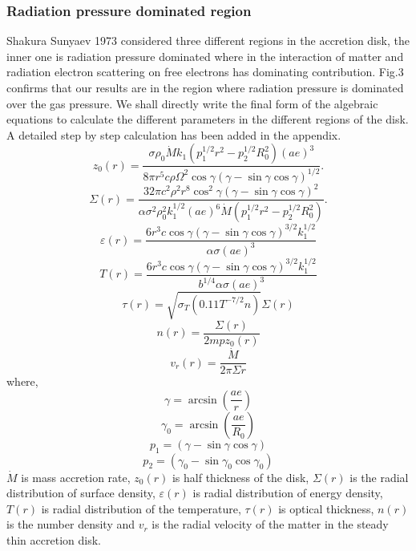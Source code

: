 \documentclass[useAMS,usenatbib]{mn2e}
\begin{document}
\subsubsection{Radiation pressure dominated region}
Shakura Sunyaev 1973 considered three different regions in the accretion disk, the inner one is radiation pressure dominated where in the interaction of matter and radiation electron scattering on free electrons has dominating contribution. Fig.3 confirms that our results are in the region where radiation pressure is dominated over the gas pressure. We shall directly write the final form of the algebraic equations to calculate the different parameters in the different regions of the disk. A detailed step by step calculation has been added in the appendix.
\begin{equation}
z_0(r) = \frac{\sigma\rho_0\dot{M}k_1\left(p_1^{1/2}r^2 - p_2^{1/2}R_0^2\right)(ae)^3}{8\pi r^5 c \rho \Omega^2\cos\gamma(\gamma - \sin\gamma\cos\gamma)^{1/2}}.
\end{equation}
\begin{equation}
\Sigma(r) = \frac{32\pi c^2\rho^2 r^8 \cos^2{\gamma}(\gamma - \sin\gamma\cos\gamma)^2}{\alpha\sigma^2\rho_0^2 k_1^{1/2}(ae)^6\dot{M}\left(p_1^{1/2}r^2 - p_2^{1/2}R_0^2\right)}.
\end{equation}
\begin{equation}
\varepsilon(r) = \frac{6 r^3 c \cos\gamma(\gamma - \sin\gamma\cos\gamma)^{3/2}k_1^{1/2}}{\alpha\sigma (ae)^3}
\end{equation}
\begin{equation}
T(r) = \frac{6r^3 c \cos\gamma (\gamma - \sin\gamma\cos\gamma)^{3/2}k_1^{1/2}}{b^{1/4}\alpha\sigma (ae)^3}
\end{equation}
\begin{equation}
\tau (r) = \sqrt{\sigma_T(0.11 T^{-7/2}n)}\Sigma(r)
\end{equation}
\begin{equation}
n(r) = \frac{\Sigma(r)}{2mpz_0(r)}
\end{equation}
\begin{equation}
v_r(r) = \frac{\dot{M}}{2\pi\Sigma r}
\end{equation}
where, 
\begin{equation} 
\gamma = \arcsin(\frac{ae}{r}) 
\end{equation}
\begin{equation}
\gamma_0 = \arcsin(\frac{ae}{R_0})
\end{equation}
\begin{equation}
p_1 = (\gamma - \sin\gamma\cos\gamma)
\end{equation}
\begin{equation}
p_2 = (\gamma_0 - \sin\gamma_0\cos\gamma_0)
\end{equation}
$\dot{M}$ is mass accretion rate, $z_0(r)$ is half thickness of the disk, $\Sigma(r)$ is the radial distribution of surface density, $\varepsilon(r)$ is radial distribution of energy density, $T(r)$ is radial distribution of the temperature, $\tau(r)$ is optical thickness, $n(r)$ is the number density and $v_r$ is the radial velocity of the matter in the steady thin accretion disk.
\end{document}
